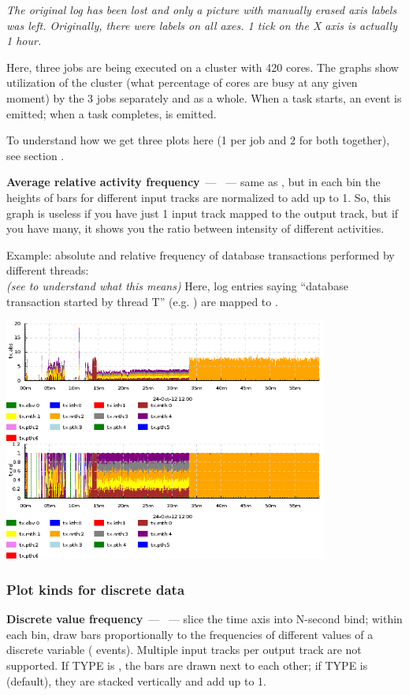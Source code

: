 \documentclass{article}
\begin{document}
\emph{The original log has been lost and only a picture with manually erased axis labels was left. Originally, there were labels on all axes. 1 tick on the X axis is actually 1 hour.}

Here, three jobs are being executed on a cluster with 420 cores. The graphs show utilization of the cluster (what percentage of cores are busy at any given moment) by the 3 jobs separately and as a whole. When a task starts, an event  is emitted; when a task completes,  is emitted.

To understand how we get three plots here (1 per job and 2 for both together), see section .

\pagebreak
\noindent
\textbf{Average relative activity frequency}~--- ~--- same as , but in each bin the heights of bars for different input tracks are normalized to add up to 1. So, this graph is useless if you have just 1 input track mapped to the output track, but if you have many, it shows you the ratio between intensity of different activities.

Example: absolute and relative frequency of database transactions performed by different threads: \\
 \emph{(see  to understand what this means)} Here, log entries saying ``database transaction started by thread T'' (e.g. ) are mapped to .

\centerline{\includegraphics[width=0.8\textwidth]{pics/tplot/graphov-tx-acount-and-afreq.png}}

\pagebreak
\subsubsection{Plot kinds for discrete data}
\noindent
\textbf{Discrete value frequency}~--- ~--- slice the time axis into N-second bind; within each bin, draw bars proportionally to the frequencies of different values of a discrete variable ( events). Multiple input tracks per output track are not supported. If TYPE is , the bars are drawn next to each other; if TYPE is  (default), they are stacked vertically and add up to 1.
\noindent
\end{document}
